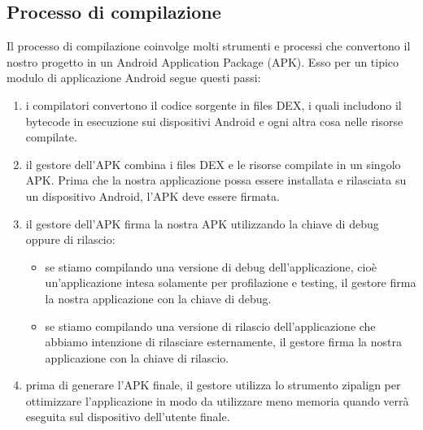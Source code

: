 \subsection{Processo di compilazione}
Il processo di compilazione coinvolge molti strumenti e processi che convertono il nostro progetto in un Android Application Package (APK). Esso per un tipico modulo di applicazione Android segue questi passi:
\begin{enumerate}
    \item i compilatori convertono il codice sorgente in files DEX, i quali includono il bytecode in esecuzione sui dispositivi Android e ogni altra cosa nelle risorse compilate.
    \item il gestore dell'APK combina i files DEX e le risorse compilate in un singolo APK. Prima che la nostra applicazione possa essere installata e rilasciata su un dispositivo Android, l'APK deve essere firmata.
    \item il gestore dell'APK firma la nostra APK utilizzando la chiave di debug oppure di rilascio:
          \begin{itemize}
              \item se stiamo compilando una versione di debug dell'applicazione, cioè un'applicazione intesa solamente per profilazione e testing, il gestore firma la nostra applicazione con la chiave di debug.
              \item se stiamo compilando una versione di rilascio dell'applicazione che abbiamo intenzione di rilasciare esternamente, il gestore firma la nostra applicazione con la chiave di rilascio.
          \end{itemize}
    \item prima di generare l'APK finale, il gestore utilizza lo strumento zipalign per ottimizzare l'applicazione in modo da utilizzare meno memoria quando verrà eseguita sul dispositivo dell'utente finale.
\end{enumerate}

